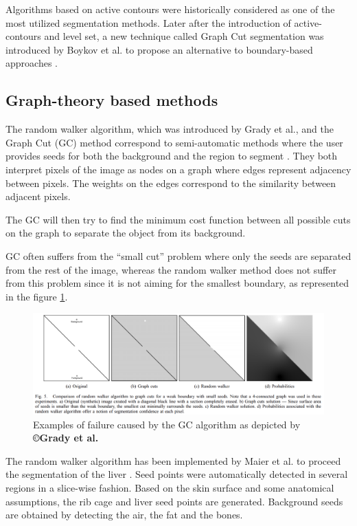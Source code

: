 \documentclass[]{article}
\begin{document}
	Algorithms based on active contours were historically considered as one
	of the most utilized segmentation methods. Later after the introduction
	of active-contours and level set, a new technique called Graph Cut
	segmentation was introduced by Boykov et al. to propose an alternative to boundary-based approaches \cite{Boykov2001}.
	
	\subsection*{Graph-theory based methods}
	
	The random walker algorithm, which was introduced by Grady et al., and the Graph Cut (GC) method correspond to
	semi-automatic methods where the user provides seeds for both the
	background and the region to segment \cite{Grady2006}. They both interpret pixels of the
	image as nodes on a graph where edges represent adjacency between
	pixels. The weights on the edges correspond to the similarity between
	adjacent pixels.
	
	The GC will then try to find the minimum cost function between all
	possible cuts on the graph to separate the object from its background.
	
	GC often suffers from the ``small cut'' problem where only the seeds are
	separated from the rest of the image, whereas the random walker method
	does not suffer from this problem since it is not aiming for the
	smallest boundary, as represented in the figure \ref{Grady2006_Fig5}.
	
	\begin{figure}[th!]
		\centering
		\includegraphics[width=0.7\linewidth]{images/image20}
		\caption{Examples of failure caused by the GC algorithm as depicted by \textbf{©Grady et al.} \cite{Grady2006}}
		\label{Grady2006_Fig5}
	\end{figure}
	
	
	The random walker algorithm has been implemented by Maier et al. to proceed the segmentation of the liver \cite{Maier2008}. Seed points were
	automatically detected in several regions in a slice-wise fashion. Based
	on the skin surface and some anatomical assumptions, the rib cage and
	liver seed points are generated. Background seeds are obtained by
	detecting the air, the fat and the bones.
	
\end{document}
